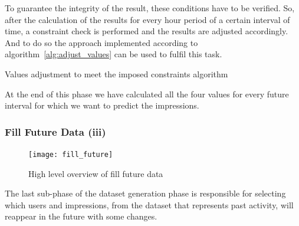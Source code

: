 To guarantee the integrity of the result, these conditions have to be verified.
So, after the calculation of the results for every hour period of a certain
interval of time, a constraint check is performed and the results
are adjusted accordingly.
And to do so the approach implemented according to
algorithm~\ref{alg:adjust_values} can be used to fulfil this task.
\\

\begin{algorithm}[H]
  \LinesNumbered
  \BlankLine

  \BlankLine
  \vspace{0.5cm}
  \caption[Constraint adjustement for statistics]{
    Values adjustment to meet the imposed constraints algorithm
  }
  \label{alg:adjust_values} \end{algorithm}

At the end of this phase we have calculated all the four
values for every future interval for which we want to predict the impressions.


\subsubsection{Fill Future Data (iii)}\label{subsubsec:fill_data}

\begin{figure}[h] \begin{center} \leavevmode
\texttt{[image: fill\_future]} \caption{ High level overview
of fill future data} \label{fig:fill_future_iii} \end{center} \end{figure}

The last sub-phase of the dataset generation phase is responsible for selecting
which users and impressions, from the dataset that represents past activity,
will reappear in the future with some changes.

